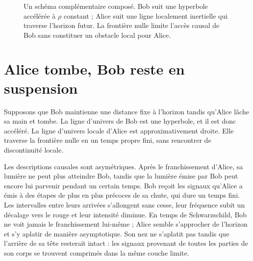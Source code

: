 \begin{figure}[htbp]
\centering
{}
\caption{Un schéma complémentaire composé. Bob suit une hyperbole accélérée à \(\rho\) constant ; Alice suit une ligne localement inertielle qui traverse l’horizon futur. La frontière nulle limite l’accès causal de Bob sans constituer un obstacle local pour Alice.}
\end{figure}

\section{Alice tombe, Bob reste en suspension}

Supposons que Bob maintienne une distance fixe à l’horizon tandis qu’Alice lâche sa main et tombe. La ligne d’univers de Bob est une hyperbole, et il est donc accéléré. La ligne d’univers locale d’Alice est approximativement droite. Elle traverse la frontière nulle en un temps propre fini, sans rencontrer de discontinuité locale.

Les descriptions causales sont asymétriques. Après le franchissement d’Alice, sa lumière ne peut plus atteindre Bob, tandis que la lumière émise par Bob peut encore lui parvenir pendant un certain temps. Bob reçoit les signaux qu’Alice a émis à des étapes de plus en plus précoces de sa chute, qui dure un temps fini. Les intervalles entre leurs arrivées s’allongent sans cesse, leur fréquence subit un décalage vers le rouge et leur intensité diminue. En temps de Schwarzschild, Bob ne voit jamais le franchissement lui-même ; Alice semble s’approcher de l’horizon et s’y aplatir de manière asymptotique. Son nez ne s’aplatit pas tandis que l’arrière de sa tête resterait intact : les signaux provenant de toutes les parties de son corps se trouvent comprimés dans la même couche limite.

